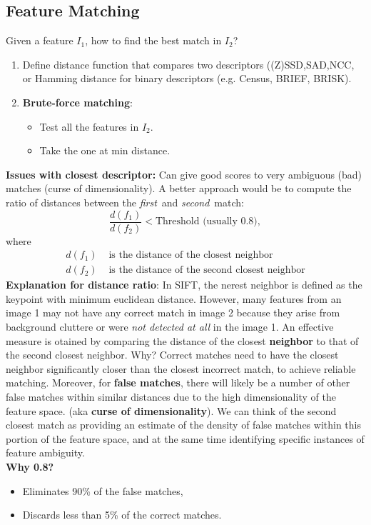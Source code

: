 \documentclass[a4paper,12 pt]{article}
\theoremstyle{definition}
\theoremstyle{remark}
\theoremstyle{definition}
\theoremstyle{definition}
\theoremstyle{definition}
\theoremstyle{remark}
\theoremstyle{definition}
\begin{document}
\subsection*{Feature Matching}
Given a feature $I_1$, how to find the best match in $I_2$?
\begin{enumerate}
\item Define distance function that compares two descriptors ((Z)SSD,SAD,NCC, or Hamming distance for binary descriptors (e.g. Census, BRIEF, BRISK).
\item \textbf{Brute-force matching}:
\begin{itemize}
\item Test all the features in $I_2$.
\item Take the one at min distance.
\end{itemize}
\end{enumerate}
\textbf{Issues with closest descriptor:} Can give good scores to very ambiguous (bad) matches (curse of dimensionality). A better approach would be to compute the ratio of distances between the \textit{first} and \textit{second} match:
\begin{equation}
\frac{d(f_1)}{d(f_2)}<\text{Threshold (usually 0.8)},
\end{equation}
where
\begin{equation}
\begin{split}
d(f_1) &\text{ is the distance of the closest neighbor}\\
d(f_2) &\text{ is the distance of the second closest neighbor}
\end{split}
\end{equation}
\textbf{Explanation for distance ratio}: In SIFT, the nerest neighbor is defined as the keypoint with minimum euclidean distance. However, many features from an image 1 may not have any correct match in image 2 because they arise from background cluttere or were \textit{not detected at all} in the image 1. An effective measure is otained by comparing the distance of the closest \textbf{neighbor} to that of the second closest neighbor. Why? Correct matches need to have the closest neighbor significantly closer than the closest incorrect match, to achieve reliable matching. Moreover, for \textbf{false matches}, there will likely be a number of other false matches within similar distances due to the high dimensionality of the feature space. (aka \textbf{curse of dimensionality}). We can think of the second closest match as providing an estimate of the density of false matches within this portion of the feature space, and at the same time identifying specific instances of feature ambiguity.\\
\textbf{Why 0.8?} 
\begin{itemize}
\item Eliminates 90\% of the false matches,
\item Discards less than 5\% of the correct matches.
\end{itemize}
\end{document}
